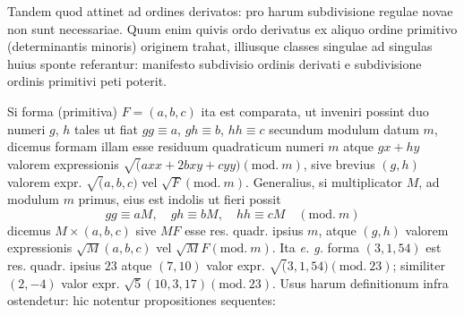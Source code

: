 Tandem quod attinet ad ordines derivatos: pro harum subdivisione regulae novae non sunt necessariae. Quum enim quivis ordo derivatus ex aliquo ordine primitivo (determinantis minoris) originem trahat, illiusque classes singulae ad singulas huius sponte referantur: manifesto subdivisio ordinis derivati e subdivisione ordinis primitivi peti poterit.

Si forma (primitiva) $F=(a,b,c)$ ita est comparata, ut inveniri possint duo numeri $g$, $h$ tales ut fiat $gg\equiv a$, $gh\equiv b$, $hh\equiv c$ secundum modulum datum $m$, dicemus formam illam esse residuum quadraticum numeri $m$ atque $gx+hy$ valorem expressionis $\surd(axx+2bxy+cyy)(\mathrm{mod.}\ m)$, sive brevius $(g,h)$ valorem expr. $\surd(a,b,c)$ vel $\surd F(\mathrm{mod.}\ m)$. Generalius, si multiplicator $M$, ad modulum $m$ primus, eius est indolis ut fieri possit
\[
gg\equiv aM,\quad gh\equiv bM,\quad hh\equiv cM\quad (\mathrm{mod.}\ m)
\]
dicemus $M\times(a,b,c)$ sive $MF$ esse res. quadr. ipsius $m$, atque $(g,h)$ valorem expressionis $\surd M(a,b,c)$ vel $\surd MF(\mathrm{mod.}\ m)$. Ita \textit{e. g.} forma $(3,1,54)$ est res. quadr. ipsius $23$ atque $(7,10)$ valor expr. $\surd(3,1,54)(\mathrm{mod.}\ 23)$; similiter $(2,-4)$ valor expr. $\surd5(10,3,17)(\mathrm{mod.}\ 23)$. Usus harum definitionum infra ostendetur: hic notentur propositiones sequentes:
